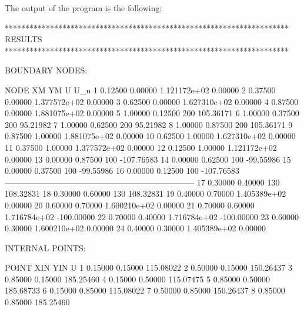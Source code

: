 The output of the program is the following:
\begin{matlaboutput}
*********************************************************************
RESULTS
*********************************************************************

BOUNDARY NODES:

NODE        XM            YM            U                   U_n
 1        0.12500       0.00000    1.121172e+02           0.00000
 2        0.37500       0.00000    1.377572e+02           0.00000
 3        0.62500       0.00000    1.627310e+02           0.00000
 4        0.87500       0.00000    1.881075e+02           0.00000
 5        1.00000       0.12500             200         105.36171
 6        1.00000       0.37500             200          95.21982
 7        1.00000       0.62500             200          95.21982
 8        1.00000       0.87500             200         105.36171
 9        0.87500       1.00000    1.881075e+02           0.00000
 10       0.62500       1.00000    1.627310e+02           0.00000
 11       0.37500       1.00000    1.377572e+02           0.00000
 12       0.12500       1.00000    1.121172e+02           0.00000
 13       0.00000       0.87500             100        -107.76583
 14       0.00000       0.62500             100         -99.55986
 15       0.00000       0.37500             100         -99.55986
 16       0.00000       0.12500             100        -107.76583
---------------------------------------------------------------------
 17       0.30000       0.40000             130         108.32831
 18       0.30000       0.60000             130         108.32831
 19       0.40000       0.70000    1.405389e+02           0.00000
 20       0.60000       0.70000    1.600210e+02           0.00000
 21       0.70000       0.60000    1.716784e+02        -100.00000
 22       0.70000       0.40000    1.716784e+02        -100.00000
 23       0.60000       0.30000    1.600210e+02           0.00000
 24       0.40000       0.30000    1.405389e+02           0.00000

INTERNAL POINTS:

POINT        XIN           YIN           U
  1        0.15000       0.15000     115.08022
  2        0.50000       0.15000     150.26437
  3        0.85000       0.15000     185.25460
  4        0.15000       0.50000     115.07475
  5        0.85000       0.50000     185.68733
  6        0.15000       0.85000     115.08022
  7        0.50000       0.85000     150.26437
  8        0.85000       0.85000     185.25460
\end{matlaboutput} 

